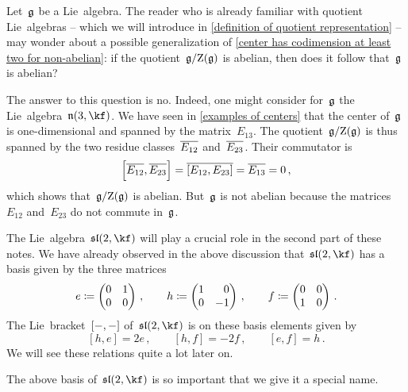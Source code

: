 \begin{warning}
	Let~$\mathfrak{g}$ be a Lie~algebra.
	The reader who is already familiar with quotient Lie~algebras -- which we will introduce in \cref{definition of quotient representation} -- may wonder about a possible generalization of \cref{center has codimension at least two for non-abelian}:
	if the quotient~$\mathfrak{g} / {\operatorname{Z}(\mathfrak{g})}$ is abelian, then does it follow that~$\mathfrak{g}$ is abelian?

	The answer to this question is no.
	Indeed, one might consider for~$\mathfrak{g}$ the Lie~algebra~$\upperlie(3, \kf)$.
	We have seen in \cref{examples of centers} that the center of~$\mathfrak{g}$ is one-dimensional and spanned by the matrix~$E_{13}$.
	The quotient~$\mathfrak{g} / {\operatorname{Z}(\mathfrak{g})}$ is thus spanned by the two residue classes~$\overline{ E_{12} }$ and~$\overline{ E_{23} }$.
	Their commutator is
	\[
		\Bigl[ \overline{ E_{12} }, \overline{ E_{23} } \Bigr]
		=
		\overline{ [ E_{12}, E_{23} ] }
		=
		\overline{ E_{13} }
		=
		0 \,,
	\]
	which shows that~$\mathfrak{g} / {\operatorname{Z}(\mathfrak{g})}$ is abelian.
	But~$\mathfrak{g}$ is not abelian because the matrices~$E_{12}$ and~$E_{23}$ do not commute in~$\mathfrak{g}$.
\end{warning}


\begin{fluff}
	The Lie~algebra~$\sllie(2,\kf)$ will play a crucial role in the second part of these notes.
	We have already observed in the above discussion that~$\sllie(2,\kf)$ has a basis given by the three matrices
	\[
		e
		\defined
		\begin{pmatrix}
			0 & 1 \\
			0 & 0
		\end{pmatrix} \,,
		\qquad
		h
		\defined
		\begin{pmatrix*}[r]
			1 &  0  \\
			0 & -1
		\end{pmatrix*}  \,,
		\qquad
		f
		\defined
		\begin{pmatrix}
			0 & 0 \\
			1 & 0
		\end{pmatrix} \,.
	\]
	The Lie~bracket~$[-, -]$ of~$\sllie(2, \kf)$ is on these basis elements given by
	\[
		[h, e]
		=
		2e  \,,
		\qquad
		[h, f]
		=
		-2 f \,,
		\qquad
		[e,f]
		=
		h \,.
	\]
	We will see these relations quite a lot later on.

	The above basis of~$\sllie(2, \kf)$ is so important that we give it a special name.
\end{fluff}


